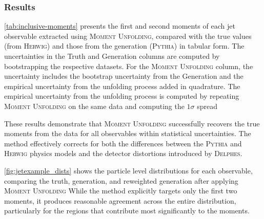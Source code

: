 \subsubsection{Results}

            \cref{tab:inclusive-moments} presents the first and second moments of each jet observable extracted using \textsc{Moment Unfolding}, compared with the true values (from \textsc{Herwig}) and those from the generation (\textsc{Pythia}) in tabular form.
            The uncertainties in the Truth and Generation columns are computed by bootstrapping the respective datasets.
            For the \textsc{Moment Unfolding} column, the uncertainty includes the bootstrap uncertainty from the Generation and the empirical uncertainty from the unfolding process added in quadrature.
            The empirical uncertainty from the unfolding process is computed by repeating \textsc{Moment Unfolding} on the same data and computing the \(1\sigma\) spread
            
            These results demonstrate that \textsc{Moment Unfolding} successfully recovers the true moments from the data for all observables within statistical uncertainties.
            The method effectively corrects for both the differences between the \textsc{Pythia} and \textsc{Herwig} physics models and the detector distortions introduced by \textsc{Delphes}.

            \cref{fig:jetexample_dists} shows the particle level distributions for each observable, comparing the truth, generation, and reweighted generation after applying \textsc{Moment Unfolding}
            While the method explicitly targets only the first two moments, it produces reasonable agreement across the entire distribution, particularly for the regions that contribute most significantly to the moments.


